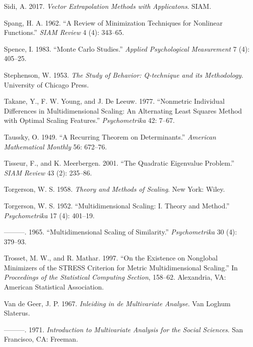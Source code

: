 \documentclass[
  12pt,
  letterpaper,
  DIV=11,
  numbers=noendperiod]{scrreprt}
\newlength{\cslhangindent}
\newenvironment{CSLReferences}[2] %
 {\begin{list}{}{%
  \setlength{\itemindent}{0pt}
  \setlength{\leftmargin}{0pt}
  \setlength{\parsep}{0pt}
  \ifodd #1
   \setlength{\leftmargin}{\cslhangindent}
   \setlength{\itemindent}{-1\cslhangindent}
  \fi
  \setlength{\itemsep}{#2\baselineskip}}}
 {\end{list}}
\theoremstyle{remark}
\begin{document}
\begin{CSLReferences}{1}{0}
Sidi, A. 2017. \emph{Vector Extrapolation Methods with Applicatons}.
SIAM.

Spang, H. A. 1962. {``{A Review of Minimization Techniques for Nonlinear
Functions}.''} \emph{SIAM Review} 4 (4): 343--65.

Spence, I. 1983. {``Monte Carlo Studies.''} \emph{Applied Psychological
Measurement} 7 (4): 405--25.

Stephenson, W. 1953. \emph{{The Study of Behavior: Q-technique and its
Methodology}}. University of Chicago Press.

Takane, Y., F. W. Young, and J. De Leeuw. 1977. {``Nonmetric Individual
Differences in Multidimensional Scaling: An Alternating Least Squares
Method with Optimal Scaling Features.''} \emph{Psychometrika} 42: 7--67.

Taussky, O. 1949. {``{A Recurring Theorem on Determinants}.''}
\emph{American Mathematical Monthly} 56: 672--76.

Tisseur, F., and K. Meerbergen. 2001. {``{The Quadratic Eigenvalue
Problem}.''} \emph{{SIAM} Review} 43 (2): 235--86.

Torgerson, W. S. 1958. \emph{{Theory and Methods of Scaling}}. New York:
Wiley.

Torgerson, W. S. 1952. {``{Multidimensional Scaling: I. Theory and
Method}.''} \emph{Psychometrika} 17 (4): 401--19.

---------. 1965. {``{Multidimensional Scaling of Similarity}.''}
\emph{Psychometrika} 30 (4): 379--93.

Trosset, M. W., and R. Mathar. 1997. {``{On the Existence on Nonglobal
Minimizers of the STRESS Criterion for Metric Multidimensional
Scaling}.''} In \emph{Proceedings of the Statistical Computing Section},
158--62. Alexandria, VA: American Statistical Association.

Van de Geer, J. P. 1967. \emph{{Inleiding in de Multivariate Analyse}}.
Van Loghum Slaterus.

---------. 1971. \emph{{Introduction to Multivariate Analysis for the
Social Sciences}}. San Francisco, CA: Freeman.


\end{CSLReferences}
\end{document}
